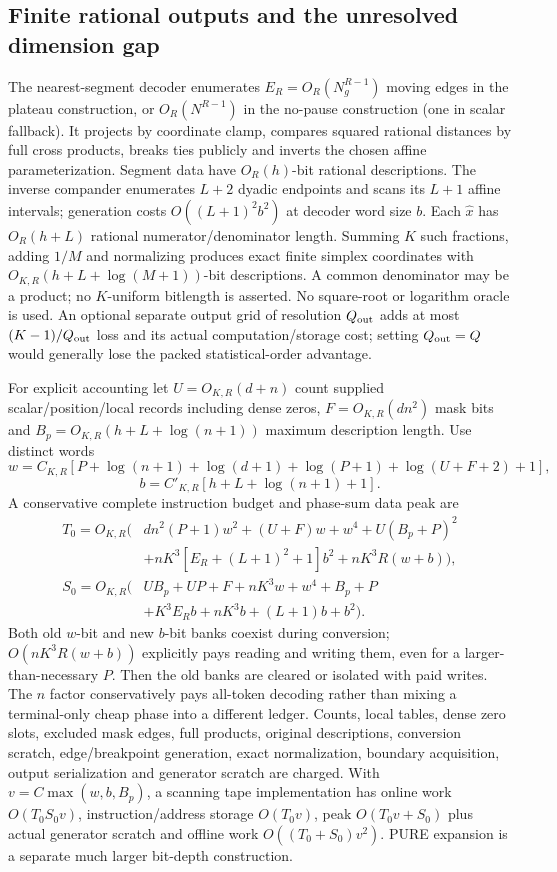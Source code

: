 \documentclass[11pt,letterpaper]{article}
\theoremstyle{definition}\newtheorem{definition}[theorem]{Definition}
\theoremstyle{remark}\newtheorem{remark}[theorem]{Remark}
\begin{document}
\subsection{Finite rational outputs and the unresolved dimension gap}
The nearest-segment decoder enumerates $E_R=O_R(N_g^{R-1})$ moving edges in the plateau construction, or $O_R(N^{R-1})$ in the no-pause construction (one in scalar fallback). It projects by coordinate clamp, compares squared rational distances by full cross products, breaks ties publicly and inverts the chosen affine parameterization. Segment data have $O_R(h)$-bit rational descriptions. The inverse compander enumerates $L+2$ dyadic endpoints and scans its $L+1$ affine intervals; generation costs $O((L+1)^2b^2)$ at decoder word size $b$. Each $\widehat x$ has $O_R(h+L)$ rational numerator/denominator length. Summing $K$ such fractions, adding $1/M$ and normalizing produces exact finite simplex coordinates with $O_{K,R}(h+L+\log(M+1))$-bit descriptions. A common denominator may be a product; no $K$-uniform bitlength is asserted. No square-root or logarithm oracle is used. An optional separate output grid of resolution $Q_{\rm out}$ adds at most $(K-1)/Q_{\rm out}$ loss and its actual computation/storage cost; setting $Q_{\rm out}=Q$ would generally lose the packed statistical-order advantage.

For explicit accounting let $U=O_{K,R}(d+n)$ count supplied scalar/position/local records including dense zeros, $F=O_{K,R}(dn^2)$ mask bits and $B_p=O_{K,R}(h+L+\log(n+1))$ maximum description length. Use distinct words
\[
 w=C_{K,R}[P+\log(n+1)+\log(d+1)+\log(P+1)+\log(U+F+2)+1],
\]
\[
 b=C'_{K,R}[h+L+\log(n+1)+1].
\]
A conservative complete instruction budget and phase-sum data peak are
\begin{align*}
 T_0=O_{K,R}\bigl(&dn^2(P+1)w^2+(U+F)w+w^4+U(B_p+P)^2\\
 &+nK^3[E_R+(L+1)^2+1]b^2+nK^3R(w+b)\bigr),\\
 S_0=O_{K,R}\bigl(&UB_p+UP+F+nK^3w+w^4+B_p+P\\
 &+K^3E_Rb+nK^3b+(L+1)b+b^2\bigr).
\end{align*}
Both old $w$-bit and new $b$-bit banks coexist during conversion; $O(nK^3R(w+b))$ explicitly pays reading and writing them, even for a larger-than-necessary $P$. Then the old banks are cleared or isolated with paid writes. The $n$ factor conservatively pays all-token decoding rather than mixing a terminal-only cheap phase into a different ledger. Counts, local tables, dense zero slots, excluded mask edges, full products, original descriptions, conversion scratch, edge/breakpoint generation, exact normalization, boundary acquisition, output serialization and generator scratch are charged. With $v=C\max(w,b,B_p)$, a scanning tape implementation has online work $O(T_0S_0v)$, instruction/address storage $O(T_0v)$, peak $O(T_0v+S_0)$ plus actual generator scratch and offline work $O((T_0+S_0)v^2)$. PURE expansion is a separate much larger bit-depth construction.
\end{document}
